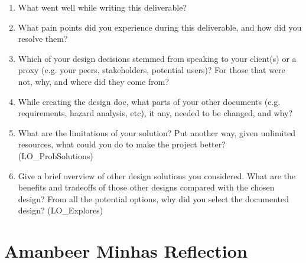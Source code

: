 \documentclass[12pt, titlepage]{article}
\begin{document}
\begin{enumerate}
  \item What went well while writing this deliverable?
  \item What pain points did you experience during this deliverable, and how
    did you resolve them?
  \item Which of your design decisions stemmed from speaking to your client(s)
  or a proxy (e.g. your peers, stakeholders, potential users)? For those that
  were not, why, and where did they come from?
  \item While creating the design doc, what parts of your other documents (e.g.
  requirements, hazard analysis, etc), it any, needed to be changed, and why?
  \item What are the limitations of your solution? Put another way, given
  unlimited resources, what could you do to make the project better?
  (LO\_ProbSolutions)
  \item Give a brief overview of other design solutions you considered. What
  are the benefits and tradeoffs of those other designs compared with the chosen
  design? From all the potential options, why did you select the documented
  design? (LO\_Explores)
\end{enumerate}

\section*{Amanbeer Minhas Reflection}
\end{document}
